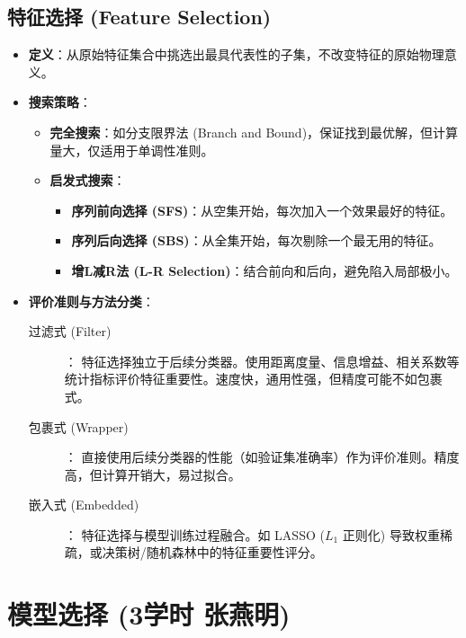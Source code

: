 \documentclass[a4paper, 11pt]{ctexart}
\begin{document}
\subsection{特征选择 (Feature Selection)}
\begin{itemize}
    \item \textbf{定义}：从原始特征集合中挑选出最具代表性的子集，不改变特征的原始物理意义。
    \item \textbf{搜索策略}：
    \begin{itemize}
        \item \textbf{完全搜索}：如分支限界法 (Branch and Bound)，保证找到最优解，但计算量大，仅适用于单调性准则。
        \item \textbf{启发式搜索}：
        \begin{itemize}
            \item \textbf{序列前向选择 (SFS)}：从空集开始，每次加入一个效果最好的特征。
            \item \textbf{序列后向选择 (SBS)}：从全集开始，每次剔除一个最无用的特征。
            \item \textbf{增L减R法 (L-R Selection)}：结合前向和后向，避免陷入局部极小。
        \end{itemize}
    \end{itemize}
    \item \textbf{评价准则与方法分类}：
    \begin{description}
        \item[过滤式 (Filter)]：
        特征选择独立于后续分类器。使用距离度量、信息增益、相关系数等统计指标评价特征重要性。速度快，通用性强，但精度可能不如包裹式。
        \item[包裹式 (Wrapper)]：
        直接使用后续分类器的性能（如验证集准确率）作为评价准则。精度高，但计算开销大，易过拟合。
        \item[嵌入式 (Embedded)]：
        特征选择与模型训练过程融合。如 LASSO ($L_1$ 正则化) 导致权重稀疏，或决策树/随机森林中的特征重要性评分。
    \end{description}
\end{itemize}

\newpage
\section{模型选择 \small{(3学时 张燕明)}}
\end{document}
